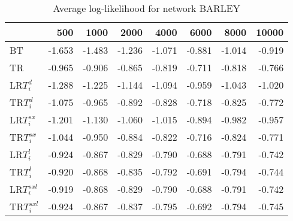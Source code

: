 \begin{table}
 \begin{center}
 \begin{tabular}{lrrrrrrr}
 & 500 & 1000 & 2000 & 4000 & 6000 & 8000 & 10000\\\hline
BT & -1.653 & -1.483 & -1.236 & -1.071 & -0.881 & -1.014 & -0.919\\\hline
TR & -0.965 & -0.906 & -0.865 & -0.819 & -0.711 & -0.818 & -0.766\\\hline
LR$T_i^d$ & -1.288 & -1.225 & -1.144 & -1.094 & -0.959 & -1.043 & -1.020\\\hline
TR$T_i^d$ & -1.075 & -0.965 & -0.892 & -0.828 & -0.718 & -0.825 & -0.772\\\hline
LR$T_i^{sx}$ & -1.201 & -1.130 & -1.060 & -1.015 & -0.894 & -0.982 & -0.957\\\hline
TR$T_i^{sx}$ & -1.044 & -0.950 & -0.884 & -0.822 & -0.716 & -0.824 & -0.771\\\hline
LR$T_i^l$ & -0.924 & -0.867 & -0.829 & -0.790 & -0.688 & -0.791 & -0.742\\\hline
TR$T_i^l$ & -0.920 & -0.868 & -0.835 & -0.792 & -0.691 & -0.794 & -0.744\\\hline
LR$T_i^{sxl}$ & -0.919 & -0.868 & -0.829 & -0.790 & -0.688 & -0.791 & -0.742\\\hline
TR$T_i^{sxl}$ & -0.924 & -0.867 & -0.837 & -0.795 & -0.692 & -0.794 & -0.745\\\hline
\end{tabular}
\end{center}
\caption{Average log-likelihood for network BARLEY }
\label{Barleyll}
\end{table}



